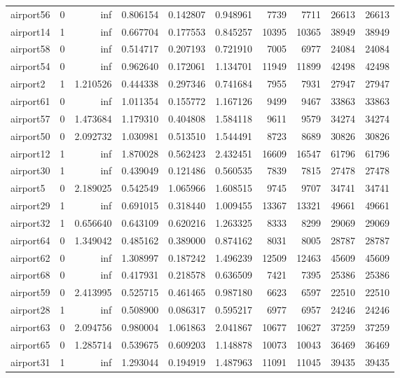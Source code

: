 \begin{longtable}{|l|r|r|r|r|r|r|r|r|r|}
airport56 & 0 & inf & 0.806154 & 0.142807 & 0.948961 & 7739 & 7711 & 26613 & 26613 \\
airport14 & 1 & inf & 0.667704 & 0.177553 & 0.845257 & 10395 & 10365 & 38949 & 38949 \\
airport58 & 0 & inf & 0.514717 & 0.207193 & 0.721910 & 7005 & 6977 & 24084 & 24084 \\
airport54 & 0 & inf & 0.962640 & 0.172061 & 1.134701 & 11949 & 11899 & 42498 & 42498 \\
airport2 & 1 & 1.210526 & 0.444338 & 0.297346 & 0.741684 & 7955 & 7931 & 27947 & 27947 \\
airport61 & 0 & inf & 1.011354 & 0.155772 & 1.167126 & 9499 & 9467 & 33863 & 33863 \\
airport57 & 0 & 1.473684 & 1.179310 & 0.404808 & 1.584118 & 9611 & 9579 & 34274 & 34274 \\
airport50 & 0 & 2.092732 & 1.030981 & 0.513510 & 1.544491 & 8723 & 8689 & 30826 & 30826 \\
airport12 & 1 & inf & 1.870028 & 0.562423 & 2.432451 & 16609 & 16547 & 61796 & 61796 \\
airport30 & 1 & inf & 0.439049 & 0.121486 & 0.560535 & 7839 & 7815 & 27478 & 27478 \\
airport5 & 0 & 2.189025 & 0.542549 & 1.065966 & 1.608515 & 9745 & 9707 & 34741 & 34741 \\
airport29 & 1 & inf & 0.691015 & 0.318440 & 1.009455 & 13367 & 13321 & 49661 & 49661 \\
airport32 & 1 & 0.656640 & 0.643109 & 0.620216 & 1.263325 & 8333 & 8299 & 29069 & 29069 \\
airport64 & 0 & 1.349042 & 0.485162 & 0.389000 & 0.874162 & 8031 & 8005 & 28787 & 28787 \\
airport62 & 0 & inf & 1.308997 & 0.187242 & 1.496239 & 12509 & 12463 & 45609 & 45609 \\
airport68 & 0 & inf & 0.417931 & 0.218578 & 0.636509 & 7421 & 7395 & 25386 & 25386 \\
airport59 & 0 & 2.413995 & 0.525715 & 0.461465 & 0.987180 & 6623 & 6597 & 22510 & 22510 \\
airport28 & 1 & inf & 0.508900 & 0.086317 & 0.595217 & 6977 & 6957 & 24246 & 24246 \\
airport63 & 0 & 2.094756 & 0.980004 & 1.061863 & 2.041867 & 10677 & 10627 & 37259 & 37259 \\
airport65 & 0 & 1.285714 & 0.539675 & 0.609203 & 1.148878 & 10073 & 10043 & 36469 & 36469 \\
airport31 & 1 & inf & 1.293044 & 0.194919 & 1.487963 & 11091 & 11045 & 39435 & 39435 \\

\end{longtable}
